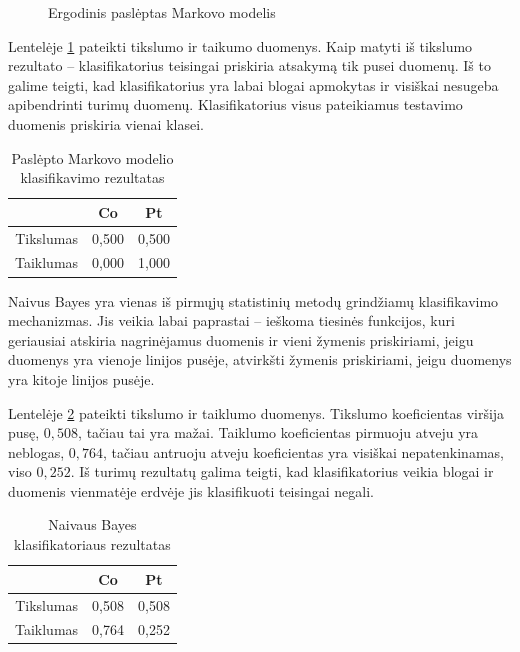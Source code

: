 \documentclass[]{vgtuef}
\begin{document}
\begin{figure}
	\centering
	
	\caption{Ergodinis paslėptas Markovo modelis}
	\label{fig:hmm_model}
\end{figure}

Lentelėje \ref{table:hmm_scores} pateikti tikslumo ir taikumo duomenys. Kaip matyti iš tikslumo rezultato -- klasifikatorius teisingai priskiria atsakymą tik pusei duomenų. Iš to galime teigti, kad klasifikatorius yra labai blogai apmokytas ir visiškai nesugeba apibendrinti turimų duomenų. Klasifikatorius visus pateikiamus testavimo duomenis priskiria vienai klasei.

\begin{table}
  \centering
  \renewcommand{\arraystretch}{1.3}
  \caption{Paslėpto Markovo modelio klasifikavimo rezultatas}
  \label{table:hmm_scores}
  \begin{tabular}{|c|c|c|} \hline
    & Co & Pt \\ \hline
    Tikslumas & 0,500 & 0,500 \\ \hline
    Taiklumas & 0,000 & 1,000 \\ \hline
  \end{tabular}
\end{table}

Naivus Bayes \cite{R22230} yra vienas iš pirmųjų statistinių metodų grindžiamų klasifikavimo mechanizmas. Jis veikia labai paprastai -- ieškoma tiesinės funkcijos, kuri geriausiai atskiria nagrinėjamus duomenis ir vieni žymenis priskiriami, jeigu duomenys yra vienoje linijos pusėje, atvirkšti žymenis priskiriami, jeigu duomenys yra kitoje linijos pusėje. 

Lentelėje \ref{table:nb_scores} pateikti tikslumo ir taiklumo duomenys. Tikslumo koeficientas viršija pusę, $0,508$, tačiau tai yra mažai. Taiklumo koeficientas pirmuoju atveju yra neblogas, $0,764$, tačiau antruoju atveju koeficientas yra visiškai nepatenkinamas, viso $0,252$. Iš turimų rezultatų galima teigti, kad klasifikatorius veikia blogai ir duomenis vienmatėje erdvėje jis klasifikuoti teisingai negali.

\begin{table}
  \centering
  \renewcommand{\arraystretch}{1.3}
  \caption{Naivaus Bayes klasifikatoriaus rezultatas}
  \label{table:nb_scores}
  \begin{tabular}{|c|c|c|} \hline
    & Co & Pt \\ \hline
    Tikslumas & 0,508 & 0,508 \\ \hline
    Taiklumas & 0,764 & 0,252 \\ \hline
  \end{tabular}
\end{table}
\end{document}
